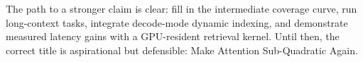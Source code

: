 \documentclass[10pt]{article}
\begin{document}
The path to a stronger claim is clear: fill in the intermediate coverage curve,
run long-context tasks, integrate decode-mode dynamic indexing, and demonstrate
measured latency gains with a GPU-resident retrieval kernel. Until then, the
correct title is aspirational but defensible: Make Attention Sub-Quadratic
Again.



\end{document}
